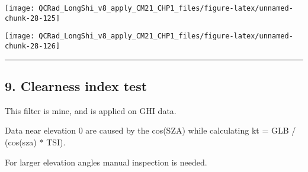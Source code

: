 \documentclass[
  10pt,
  a4paper,oneside]{article}
\begin{document}
\begin{center}\texttt{[image: QCRad\_LongShi\_v8\_apply\_CM21\_CHP1\_files/figure-latex/unnamed-chunk-28-125]} \end{center}

\begin{center}\texttt{[image: QCRad\_LongShi\_v8\_apply\_CM21\_CHP1\_files/figure-latex/unnamed-chunk-28-126]} \end{center}

\begin{center}\rule{0.5\linewidth}{0.5pt}\end{center}

\newpage

\hypertarget{clearness-index-test}{%
\subsection{9. Clearness index test}\label{clearness-index-test}}

This filter is mine, and is applied on GHI data.

Data near elevation 0 are caused by the cos(SZA) while calculating
kt = GLB / (cos(sza) * TSI).

For larger elevation angles manual inspection is needed.
\end{document}
